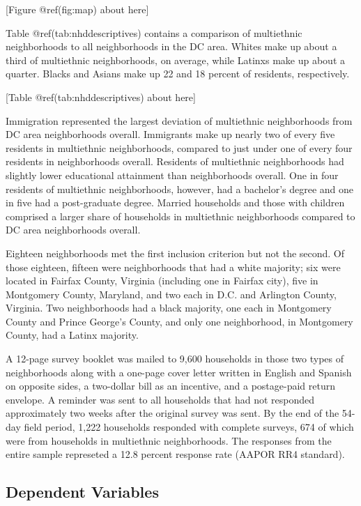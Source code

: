\documentclass{baderart}
\begin{document}
{[}Figure @ref(fig:map) about here{]}

Table @ref(tab:nhddescriptives) contains a comparison of multiethnic
neighborhoods to all neighborhoods in the DC area. Whites make up about
a third of multiethnic neighborhoods, on average, while Latinxs make up
about a quarter. Blacks and Asians make up 22 and 18 percent of
residents, respectively.

{[}Table @ref(tab:nhddescriptives) about here{]}

Immigration represented the largest deviation of multiethnic
neighborhoods from DC area neighborhoods overall. Immigrants make up
nearly two of every five residents in multiethnic neighborhoods,
compared to just under one of every four residents in neighborhoods
overall. Residents of multiethnic neighborhoods had slightly lower
educational attainment than neighborhoods overall. One in four residents
of multiethnic neighborhoods, however, had a bachelor's degree and one
in five had a post-graduate degree. Married households and those with
children comprised a larger share of households in multiethnic
neighborhoods compared to DC area neighborhoods overall.

Eighteen neighborhoods met the first inclusion criterion but not the
second. Of those eighteen, fifteen were neighborhoods that had a white
majority; six were located in Fairfax County, Virginia (including one in
Fairfax city), five in Montgomery County, Maryland, and two each in D.C.
and Arlington County, Virginia. Two neighborhoods had a black majority,
one each in Montgomery County and Prince George's County, and only one
neighborhood, in Montgomery County, had a Latinx majority.

A 12-page survey booklet was mailed to 9,600 households in those two
types of neighborhoods along with a one-page cover letter written in
English and Spanish on opposite sides, a two-dollar bill as an
incentive, and a postage-paid return envelope. A reminder was sent to
all households that had not responded approximately two weeks after the
original survey was sent. By the end of the 54-day field period, 1,222
households responded with complete surveys, 674 of which were from
households in multiethnic neighborhoods. The responses from the entire
sample represeted a 12.8 percent response rate (AAPOR RR4 standard).

\subsection{Dependent Variables}\label{dependent-variables}
\end{document}
